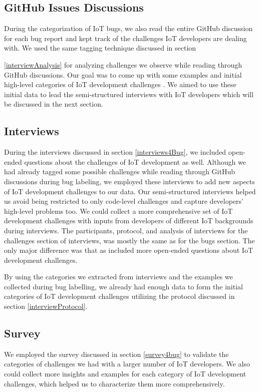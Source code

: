 \subsection{GitHub Issues Discussions}
During the categorization of IoT bugs, we also read the entire GitHub discussion for each bug report and kept track of the challenges IoT developers are dealing with. We used the same tagging technique discussed in section {\autoref{interviewAnalysis} for analyzing challenges we observe while reading through GitHub discussions. Our goal was to come up with some examples and initial high-level categories of IoT development challenges . We aimed to use these initial data to lead the semi-structured interviews with IoT developers which will be discussed in the next section.


\subsection{Interviews}
During the interviews discussed in section \autoref{interviews4Bug}, we included open-ended questions about the challenges of IoT development as well. Although we had already tagged some possible challenges while reading through GitHub discussions during bug labeling, we employed these interviews to add new aspects of IoT development challenges to our data. Our semi-structured interviews helped us avoid being restricted to only code-level challenges and capture developers' high-level problems too. We could collect a more comprehensive set of IoT development challenges with inputs from developers of different IoT backgrounds during interviews. The participants, protocol, and analysis of interviews for the challenges section of interviews, was mostly the same as for the bugs section. The only major difference was that as included more open-ended questions about IoT development challenges. 

By using the categories we extracted from interviews and the examples we collected during bug labelling, we already had enough data to form the initial categories of IoT development challenges utilizing the protocol discussed in section \autoref{interviewProtocol}. 

\subsection{Survey}
We employed the survey discussed in section \autoref{survey4bug}  to validate the categories of challenges we had with a larger number of IoT developers. We also could collect more insights and examples for each category of IoT development challenges, which helped us to characterize them more comprehensively. 


}
